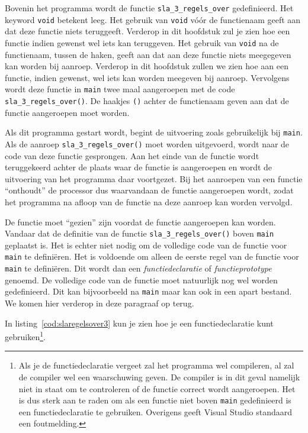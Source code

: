 Bovenin het programma wordt de functie \texttt{sla\_3\_regels\_over} gedefinieerd.
Het keyword \texttt{void} betekent leeg.
Het gebruik van \texttt{void} vóór de functienaam geeft aan dat deze functie niets teruggeeft.
Verderop in dit hoofdstuk zul je zien hoe een functie indien gewenst wel iets kan teruggeven.
Het gebruik van \texttt{void} na de functienaam, tussen de haken, geeft aan dat aan deze functie niets meegegeven kan worden bij aanroep. 
Verderop in dit hoofdstuk zullen we zien hoe aan een functie, indien gewenst, wel iets kan worden meegeven bij aanroep.
Vervolgens wordt deze functie in \texttt{main} twee maal aangeroepen met de code \texttt{sla\_3\_regels\_over()}.
De haakjes \texttt{()} achter de functienaam geven aan dat de functie aangeroepen moet worden.
 
Als dit programma gestart wordt, begint de uitvoering zoals gebruikelijk bij \texttt{main}.
Als de aanroep \texttt{sla\_3\_regels\_over()} moet worden uitgevoerd, wordt naar de code van deze functie gesprongen.
Aan het einde van de functie wordt teruggekeerd achter de plaats waar de functie is aangeroepen en wordt de uitvoering van het programma daar voortgezet.
Bij het aanroepen van een functie ``onthoudt'' de processor dus waarvandaan de functie aangeroepen wordt, zodat het programma na afloop van de functie na deze aanroep kan worden vervolgd.

De functie moet ``gezien'' zijn voordat de functie aangeroepen kan worden.
Vandaar dat de definitie van de functie \texttt{sla\_3\_regels\_over()} boven \texttt{main} geplaatst is.
Het is echter niet nodig om de volledige code van de functie voor \texttt{main} te definiëren.
Het is voldoende om alleen de eerste regel van de functie voor \texttt{main} te definiëren.
Dit wordt dan een \textsl{functiedeclaratie} of \textsl{functieprototype} genoemd.
De volledige code van de functie moet natuurlijk nog wel worden gedefinieerd.
Dit kan bijvoorbeeld na \texttt{main} maar kan ook in een apart bestand.
We komen hier verderop in deze paragraaf op terug.

In listing~\ref{cod:slaregelsover3} kun je zien hoe je een functiedeclaratie kunt gebruiken\footnote{%
	Als je de functiedeclaratie vergeet zal het programma wel compileren, al zal de compiler wel een waarschuwing geven. 
	De compiler is in dit geval namelijk niet in staat om te controleren of de functie correct wordt aangeroepen. 
	Het is dus sterk aan te raden om als een functie niet boven \texttt{main} gedefinieerd is een functiedeclaratie te gebruiken. Overigens geeft Visual Studio standaard een foutmelding.
}.

